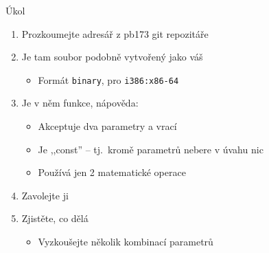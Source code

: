 \begin{frame}{Úkol}

  \begin{enumerate}
    \item Prozkoumejte adresář  z pb173 git repozitáře
    \item Je tam soubor  podobně vytvořený jako váš
    \begin{itemize}
      \item Formát \texttt{binary}, pro \texttt{i386:x86-64}
    \end{itemize}

    \item Je v něm funkce, nápověda:
    \begin{itemize}
      \item Akceptuje dva  parametry a vrací  
      \item Je ,,const'' -- tj.\ kromě parametrů nebere v úvahu nic
      \item Používá jen 2 matematické operace
    \end{itemize}

    \item Zavolejte ji
    \item Zjistěte, co dělá
    \begin{itemize}
      \item Vyzkoušejte několik kombinací parametrů
    \end{itemize}
  \end{enumerate}

\end{frame}
